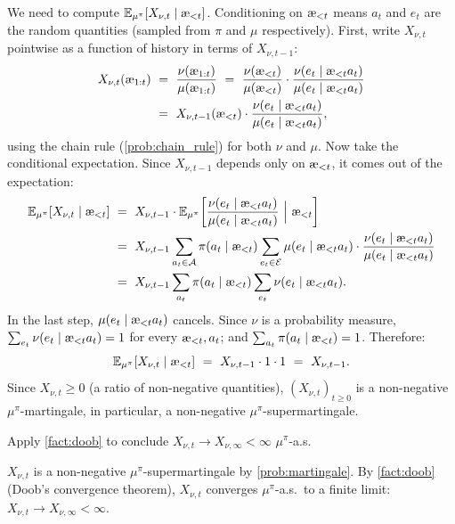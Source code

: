 \documentclass[fontsize=11pt, parskip=half]{scrartcl}
\newcommand{\cA}{\mathcal{A}}
\newcommand{\cE}{\mathcal{E}}
\newcommand{\Ex}{\mathbb{E}}
\newcommand{\aes}{\textnormal{\ae}}
\begin{document}
\begin{solution}
We need to compute $\Ex_{\mu^\pi}[X_{\nu,t} \mid \aes_{<t}]$. Conditioning on $\aes_{<t}$ means $a_t$ and $e_t$ are the random quantities (sampled from $\pi$ and $\mu$ respectively). First, write $X_{\nu,t}$ pointwise as a function of history in terms of $X_{\nu,t-1}$:
\begin{align*}
    X_{\nu,t}(\aes_{1:t}) ~&=~ \frac{\nu(\aes_{1:t})}{\mu(\aes_{1:t})}
    ~=~ \frac{\nu(\aes_{<t})}{\mu(\aes_{<t})} \cdot \frac{\nu(e_t \mid \aes_{<t} a_t)}{\mu(e_t \mid \aes_{<t} a_t)} \\
    ~&=~ X_{\nu,t-1}(\aes_{<t}) \cdot \frac{\nu(e_t \mid \aes_{<t} a_t)}{\mu(e_t \mid \aes_{<t} a_t)},
\end{align*}
using the chain rule (\cref{prob:chain_rule}) for both $\nu$ and $\mu$. Now take the conditional expectation. Since $X_{\nu,t-1}$ depends only on $\aes_{<t}$, it comes out of the expectation:
\begin{align*}
    \Ex_{\mu^\pi}[X_{\nu,t} \mid \aes_{<t}]
    ~&=~ X_{\nu,t-1} \cdot \Ex_{\mu^\pi}\!\left[\frac{\nu(e_t \mid \aes_{<t} a_t)}{\mu(e_t \mid \aes_{<t} a_t)} ~\Big|~ \aes_{<t}\right] \\
    ~&=~ X_{\nu,t-1} \sum_{a_t \in \cA} \pi(a_t \mid \aes_{<t}) \sum_{e_t \in \cE} \mu(e_t \mid \aes_{<t} a_t) \cdot \frac{\nu(e_t \mid \aes_{<t} a_t)}{\mu(e_t \mid \aes_{<t} a_t)} \\
    ~&=~ X_{\nu,t-1} \sum_{a_t} \pi(a_t \mid \aes_{<t}) \sum_{e_t} \nu(e_t \mid \aes_{<t} a_t).
\end{align*}
In the last step, $\mu(e_t \mid \aes_{<t} a_t)$ cancels. Since $\nu$ is a probability measure, $\sum_{e_t} \nu(e_t \mid \aes_{<t} a_t) = 1$ for every $\aes_{<t}, a_t$; and $\sum_{a_t} \pi(a_t \mid \aes_{<t}) = 1$. Therefore:
\[
    \Ex_{\mu^\pi}[X_{\nu,t} \mid \aes_{<t}] ~=~ X_{\nu,t-1} \cdot 1 \cdot 1 ~=~ X_{\nu,t-1}.
\]
Since $X_{\nu,t} \geq 0$ (a ratio of non-negative quantities), $(X_{\nu,t})_{t \geq 0}$ is a non-negative $\mu^\pi$-martingale, in particular, a non-negative $\mu^\pi$-supermartingale.
\end{solution}

\begin{exercise}
\label{prob:X_converges}
Apply \cref{fact:doob} to conclude $X_{\nu,t} \to X_{\nu,\infty} < \infty$ $\mu^\pi$-a.s.

\end{exercise}

\begin{solution}
$X_{\nu,t}$ is a non-negative $\mu^\pi$-supermartingale by \cref{prob:martingale}. By \cref{fact:doob} (Doob's convergence theorem), $X_{\nu,t}$ converges $\mu^\pi$-a.s.\ to a finite limit: $X_{\nu,t} \to X_{\nu,\infty} < \infty$.
\end{solution}
\end{document}
